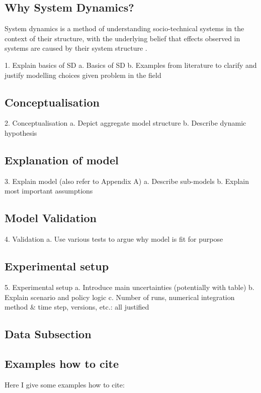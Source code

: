 
\subsection{Why System Dynamics?}
System dynamics is a method of understanding socio-technical systems in the context of their structure, with the underlying belief that effects observed in systems are caused by their system structure \parencite{pruyt_triple_2013}.

1.	Explain basics of SD
    a.	Basics of SD
    b.	Examples from literature to clarify and justify modelling choices given problem in the field
    
\subsection{Conceptualisation}
2.	Conceptualisation
    a.	Depict aggregate model structure
    b.	Describe dynamic hypothesis
    
\subsection{Explanation of model}
3.	Explain model (also refer to Appendix A)
    a.	Describe sub-models
    b.	Explain most important assumptions
    
\subsection{Model Validation}
4.	Validation
    a.	Use various tests to argue why model is fit for purpose
    
\subsection{Experimental setup}
5.	Experimental setup
    a.	Introduce main uncertainties (potentially with table)
    b.	Explain scenario and policy logic
    c.	Number of runs, numerical integration method & time step, versions, etc.: all justified

\subsection{Data Subsection}
\blindtext

\subsection*{Examples how to cite}

Here I give some examples how to cite:
\cite{moore_campylobacter_2005}
\parencite{moore_campylobacter_2005} 
\textcite{moore_campylobacter_2005}
\citeauthor{moore_campylobacter_2005}

